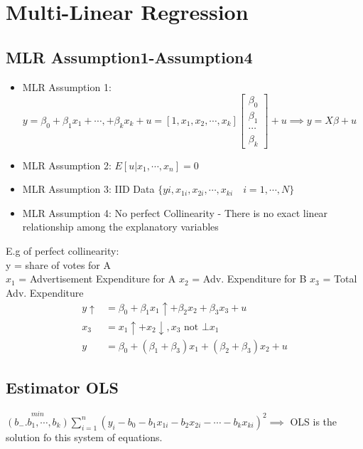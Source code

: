 \documentclass{article}
\theoremstyle{definition}
\theoremstyle{thrm}
\theoremstyle{lma}
\theoremstyle{ppst}
\theoremstyle{crlr}
\begin{document}
\section{Multi-Linear Regression}
\subsection{MLR Assumption1-Assumption4}
\begin{itemize}
	\item MLR Assumption 1: $y = \beta_0+\beta_1x_1+\cdots,+\beta_kx_k+u = [1,x_1,x_2,\cdots, x_k]\begin{bmatrix}
		\beta_0\\
		\beta_1\\
		\cdots\\
		\beta_k
	\end{bmatrix}+u\implies y = X\beta+u$
	\item MLR Assumption 2: $E[u|x_1,\cdots, x_n] = 0$
	\item MLR Assumption 3: IID Data $\{yi,x_{1i},x_{2i},\cdots,x_{ki} \quad i = 1,\cdots, N \}$
	\item MLR Assumption 4: No perfect Collinearity -  There is no exact linear relationship among the explanatory variables
\end{itemize}
E.g of perfect collinearity: \\
y = share of votes for A\\
$x_1$ = Advertisement Expenditure for A
$x_2$ = Adv. Expenditure for B
$x_3$ = Total Adv. Expenditure
\begin{align*}
	y\uparrow &=\beta_0+\beta_1x_1\uparrow+\beta_2x_2+\beta_3x_3+u\\
	x_3 &= x_1\uparrow +x_2\downarrow ,x_3 \text{ not } \bot x_1\\
	y&= \beta_0+(\beta_1+\beta_3)x_1+(\beta_2+\beta_3)x_2+u
\end{align*}
\subsection{Estimator OLS}
$\stackrel{min}{(b_-.b_1,\cdots,b_k)} \sum_{i=1}^n(y_i-b_0-b_1x_{1i}-b_2x_{2i}-\cdots - b_kx_{ki})^2 \implies$ OLS is the solution fo this system of equations.
\end{document}

